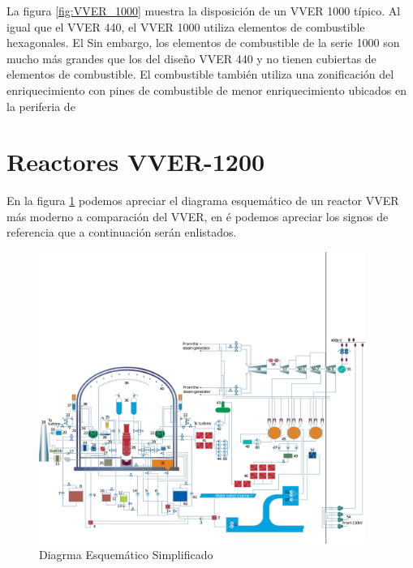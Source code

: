 \documentclass[]{article}
\begin{document}
La figura \ref{fig:VVER_1000} muestra la disposición de un VVER 1000 típico. Al igual que el VVER 440, el VVER 1000 utiliza elementos de combustible hexagonales. El
Sin embargo, los elementos de combustible de la serie 1000 son mucho más grandes que los del diseño VVER 440 y no tienen cubiertas de elementos de combustible. El combustible también utiliza una zonificación del enriquecimiento con pines de combustible de menor enriquecimiento ubicados en la periferia de
\citep{Lamarsh2001}\\

\section{Reactores VVER-1200}

En la figura \ref{fig:DiagramaVVER} podemos apreciar el diagrama esquemático de un reactor VVER más moderno a comparación del VVER, en é podemos apreciar los signos de referencia que a continuación serán enlistados.\\

\begin{figure}[h!]
	\centering
	\includegraphics[width=0.95\textwidth]{DiagramaReactorVVER}
	\caption{Diagrma Esquemático Simplificado \citep{Rosatom}}
	\label{fig:DiagramaVVER}
\end{figure}
\end{document}
